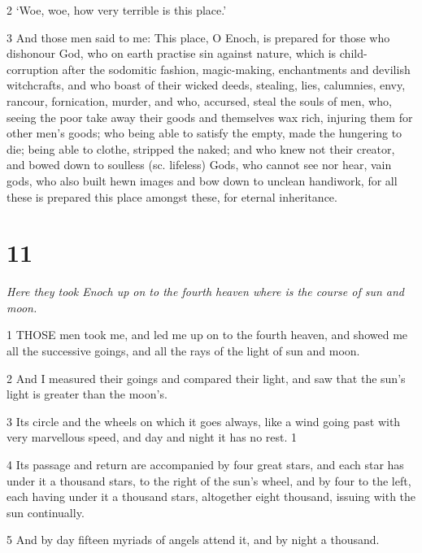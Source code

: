 \par 2 ‘Woe, woe, how very terrible is this place.’

\par 3 And those men said to me: This place, O Enoch, is prepared for those who dishonour God, who on earth practise sin against nature, which is child-corruption after the sodomitic fashion, magic-making, enchantments and devilish witchcrafts, and who boast of their wicked deeds, stealing, lies, calumnies, envy, rancour, fornication, murder, and who, accursed, steal the souls of men, who, seeing the poor take away their goods and themselves wax rich, injuring them for other men's goods; who being able to satisfy the empty, made the hungering to die; being able to clothe, stripped the naked; and who knew not their creator, and bowed down to soulless (sc. lifeless) Gods, who cannot see nor hear, vain gods, who also built hewn images and bow down to unclean handiwork, for all these is prepared this place amongst these, for eternal inheritance.

\chapter{11}

\par \textit{Here they took Enoch up on to the fourth heaven where is the course of sun and moon.}

\par 1 THOSE men took me, and led me up on to the fourth heaven, and showed me all the successive goings, and all the rays of the light of sun and moon.

\par 2 And I measured their goings and compared their light, and saw that the sun's light is greater than the moon's.

\par 3 Its circle and the wheels on which it goes always, like a wind going past with very marvellous speed, and day and night it has no rest. 1

\par 4 Its passage and return are accompanied by four great stars, and each star has under it a thousand stars, to the right of the sun's wheel, and by four to the left, each having under it a thousand stars, altogether eight thousand, issuing with the sun continually.

\par 5 And by day fifteen myriads of angels attend it, and by night a thousand.

